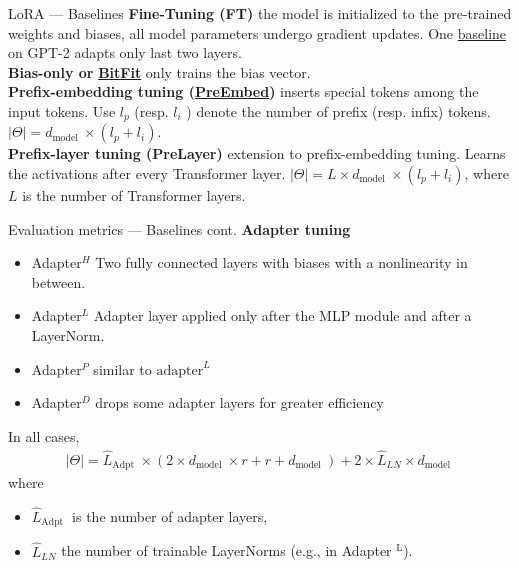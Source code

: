 \documentclass[aspectratio=169,xcolor=dvipsnames]{beamer}
\begin{document}
\begin{frame}[c]{LoRA --- Baselines} 
    \textbf{Fine-Tuning (FT)} the model is initialized to the pre-trained weights and biases, all model parameters undergo gradient updates. One \href{https://arxiv.org/pdf/2101.00190}{baseline} on GPT-2 adapts only last two layers. \\
    \medskip
    \textbf{Bias-only or} \href{https://arxiv.org/abs/2106.10199}{\textbf{BitFit}} only trains the bias vector. \\
    \medskip
    \textbf{Prefix-embedding tuning (\href{https://arxiv.org/abs/2101.00190}{\textbf{PreEmbed}})} inserts special tokens among the input tokens. Use $l_{p}$ (resp. $l_{i}$ ) denote the number of prefix (resp. infix) tokens. $|\Theta|=d_{\text {model }} \times\left(l_{p}+l_{i}\right)$.\\
    \medskip
    \textbf{Prefix-layer tuning (PreLayer)} extension to prefix-embedding tuning. Learns the activations after every Transformer layer. $|\Theta|=L \times d_{\text {model }} \times\left(l_{p}+l_{i}\right)$, where $L$ is the number of Transformer layers.\\
\end{frame}


\begin{frame}{Evaluation metrics --- Baselines cont.}
    \textbf{Adapter tuning} 
    \begin{itemize}
        \item Adapter${ }^{H}$ Two fully connected layers with biases with a nonlinearity in between.
        \item Adapter${ }^{L}$ Adapter layer applied only after the MLP module and after a LayerNorm.
        \item Adapter${ }^{P}$ similar to $\text{adapter}^L$
        \item Adapter${ }^{D}$ drops some adapter layers for greater efficiency
    \end{itemize}
    \medskip
    In all cases, 
    \begin{align*}
        |\Theta|=\hat{L}_{\text {Adpt }} \times\left(2 \times d_{\text {model }} \times r+r+d_{\text {model }}\right)+2 \times \hat{L}_{L N} \times d_{\text {model }}
    \end{align*}
    where \\
    \begin{itemize}
        \item $\hat{L}_{\text {Adpt }}$ is the number of adapter layers,
        \item $\hat{L}_{L N}$ the number of trainable LayerNorms (e.g., in Adapter ${ }^{\mathrm{L}}$).
    \end{itemize}

    
\end{frame}
\end{document}
